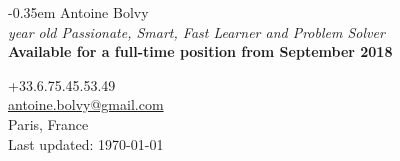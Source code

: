 \documentclass[
  english,
  letterpaper
]{resume-openfont}
\begin{document}
\noindent%
\begin{minipage}{.5\textwidth}
\kern-0.35em
{
  \fontsize{28pt}{28pt}
  \selectfont Antoine Bolvy\\
}
\textit{ year old Passionate, Smart, Fast Learner and Problem Solver}\\
\textbf{Available for a full-time position from September 2018}
\vspace{5pt}


\end{minipage}%
\begin{minipage}{.5\textwidth}
\begin{flushright}
\color{headings}+33.6.75.45.53.49\\
\href{mailto:antoine.bolvy@gmail.com}{antoine.bolvy@gmail.com}\\
Paris, France\\
{\color{date}\fontsize{7pt}{12pt}\selectfont{}Last updated: \today}
\end{flushright}
\end{minipage}

\noindent\makebox[\linewidth]{
{\color{headingsrulegray}\rule{\paperwidth}{0.4pt}}}
\vspace{-18pt}

%
%
\end{document}
